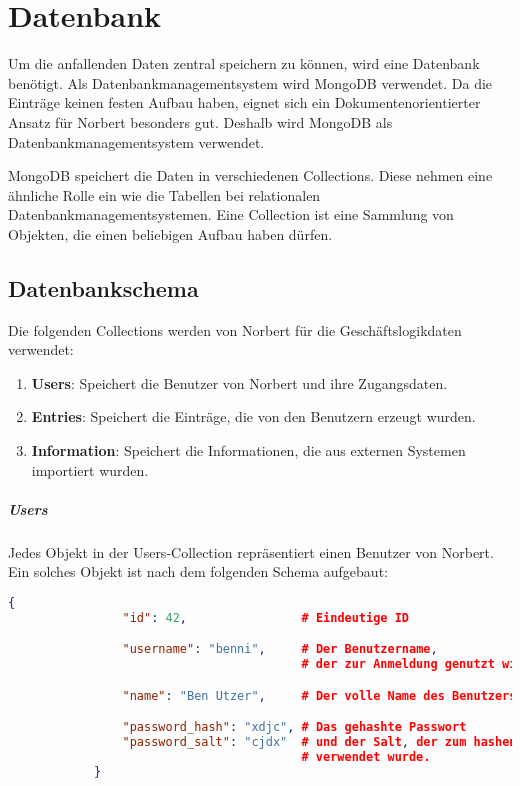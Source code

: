 
\chapter{Datenbank}

Um die anfallenden Daten zentral speichern zu können, wird eine Datenbank benötigt. Als Datenbankmanagementsystem wird MongoDB verwendet. Da die Einträge keinen festen Aufbau haben, eignet sich ein Dokumentenorientierter Ansatz für Norbert besonders gut. Deshalb wird MongoDB als Datenbankmanagementsystem verwendet.

MongoDB speichert die Daten in verschiedenen Collections. Diese nehmen eine ähnliche Rolle ein wie die Tabellen bei relationalen Datenbankmanagementsystemen. Eine Collection ist eine Sammlung von Objekten, die einen beliebigen Aufbau haben dürfen.

\section{Datenbankschema} %
\label{sec:datenbankschema}

	Die folgenden Collections werden von Norbert für die Geschäftslogikdaten verwendet:

	\begin{enumerate}
		\item \textbf{Users}: Speichert die Benutzer von Norbert und ihre Zugangsdaten.
		\item \textbf{Entries}: Speichert die Einträge, die von den Benutzern erzeugt wurden.
		\item \textbf{Information}: Speichert die Informationen, die aus externen Systemen importiert wurden.
	\end{enumerate}

	\paragraph{Users} %
	\label{par:users}

		Jedes Objekt in der Users-Collection repräsentiert einen Benutzer von Norbert. Ein solches Objekt ist nach dem folgenden Schema aufgebaut:

		\begin{lstlisting}[language=JSON]
			{
				"id": 42,                # Eindeutige ID

				"username": "benni",     # Der Benutzername, 
				                         # der zur Anmeldung genutzt wird.

				"name": "Ben Utzer",     # Der volle Name des Benutzers

				"password_hash": "xdjc", # Das gehashte Passwort
				"password_salt": "cjdx"  # und der Salt, der zum hashen des Passworts 
				                         # verwendet wurde.
			}
		\end{lstlisting}
